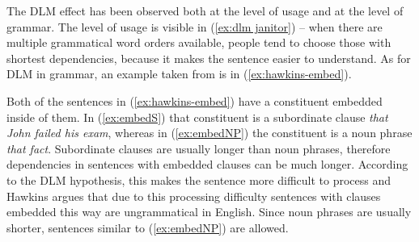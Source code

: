 The DLM effect has been observed both at the level of usage and at the level of grammar. The level of usage is visible in (\ref{ex:dlm janitor}) -- when there are multiple grammatical word orders available, people tend to choose those with shortest dependencies, because it makes the sentence easier to understand. As for DLM in grammar, an example taken from \cite[p.~20]{Hawkins-1994} is in (\ref{ex:hawkins-embed}). 
\begin{exe}
\ex\label{ex:hawkins-embed}
\begin{xlist}
	\label{ex:embedS}
	\label{ex:embedNP}
\end{xlist}
\end{exe}
Both of the sentences in (\ref{ex:hawkins-embed}) have a constituent embedded inside of them. In (\ref{ex:embedS}) that constituent is a subordinate clause \textsl{that John failed his exam}, whereas in (\ref{ex:embedNP}) the constituent is a noun phrase \textsl{that fact}. Subordinate clauses are usually longer than noun phrases, therefore dependencies in sentences with embedded clauses can be much longer. According to the DLM hypothesis, this makes the sentence more difficult to process and Hawkins argues that due to this processing difficulty sentences with clauses embedded this way are ungrammatical in English. Since noun phrases are usually shorter, sentences similar to (\ref{ex:embedNP}) are allowed. 

